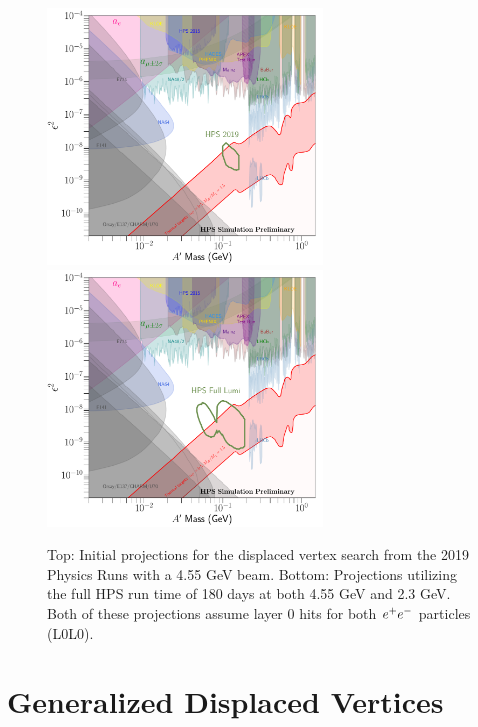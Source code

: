 \begin{figure}
    \centering
    \includegraphics[width=0.65\textwidth]{figs/upgrades/reach_2019.pdf}
    \includegraphics[width=0.65\textwidth]{figs/upgrades/reach_full_lumi.pdf}
    \caption{Top: Initial projections for the displaced vertex search from the 2019 Physics Runs with a 4.55 GeV beam. Bottom: Projections utilizing the full HPS run time of 180 days at both 4.55 GeV and 2.3 GeV. Both of these projections assume layer 0 hits for both $e^{+}e^{-}$ particles (L0L0).}
    \label{fig:projections}
\end{figure}

\clearpage



\section{Generalized Displaced Vertices}\label{sec:gen_vert}

